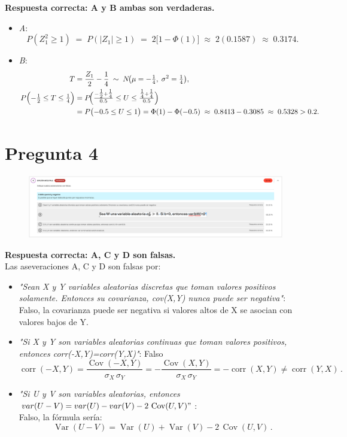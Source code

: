 \documentclass[10pt]{article}
\DeclareMathOperator{\Cov}{Cov}
\DeclareMathOperator{\Var}{Var}
\DeclareMathOperator{\corr}{corr}
\begin{document}
\textbf{Respuesta correcta: A y B ambas son verdaderas.}  
\begin{itemize}
    \item \textit{A}: 
    \[
      P(Z_1^2 \ge 1) \;=\; P(|Z_1| \ge 1)
      \;=\; 2\bigl[1 - \Phi(1)\bigr]
      \;\approx\; 2(0.1587)
      \;\approx\; 0.3174.
    \]
    \item \textit{B}:
    \[
        \begin{aligned}
            T &= \frac{Z_1}{2} - \frac14
                  \;\sim\; N\!\bigl(\mu=-\tfrac14,\;\sigma^2=\tfrac14\bigr),\\
            P\Bigl(-\tfrac12 \le T \le \tfrac14\Bigr)
            &= P\!\Bigl(\tfrac{-\tfrac12 + \tfrac14}{0.5} \le U \le \tfrac{\tfrac14 + \tfrac14}{0.5}\Bigr)\\
            &= P\bigl(-0.5 \le U \le 1\bigr)
            = \Phi(1) - \Phi(-0.5)
            \;\approx\; 0.8413 - 0.3085
            \;\approx\; 0.5328
            > 0.2.
        \end{aligned}
    \]
\end{itemize}
\section{Pregunta 4}
\begin{figure}[H]
    \centering
    \includegraphics[width=1\textwidth]{images/pregunta4.png}
\end{figure}

\textbf{Respuesta correcta: A, C y D son falsas.}\\
Las aseveraciones A, C y D son falsas por:

\begin{itemize}
    \item \textit{"Sean X y Y variables aleatorias discretas que toman valores positivos solamente. Entonces su covarianza, cov(X,Y) nunca puede ser negativa"}: Falso, la covarianza puede ser negativa si valores altos de X se asocian con valores bajos de Y.
    \item \textit{"Si X y Y son variables aleatorias continuas que toman valores positivos, entonces corr(-X,Y)=corr(Y,X)"}: Falso  
    \[
      \corr(-X,Y)=\frac{\Cov(-X,Y)}{\sigma_X\,\sigma_Y}
      =-\frac{\Cov(X,Y)}{\sigma_X\,\sigma_Y}
      =-\corr(X,Y)
      \neq \corr(Y,X)\,.
    \]
    \item \textit{"Si U y V son variables aleatorias, entonces $var(U-V)=var(U)-var(V)-2\,\Cov(U,V)"$}:\\ Falso, la fórmula sería:  
    \[
      \Var(U-V)=\Var(U)+\Var(V)-2\,\Cov(U,V)\,.
    \]
\end{itemize}
\end{document}
